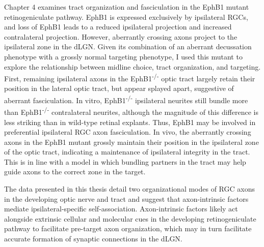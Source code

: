 Chapter 4 examines tract organization and fasciculation in the EphB1 mutant retinogeniculate pathway.
EphB1 is expressed exclusively by ipsilateral RGCs, and loss of EphB1 leads to a reduced ipsilateral projection and increased contralateral projection.
However, aberrantly crossing axons project to the ipsilateral zone in the dLGN.
Given its combination of an aberrant decussation phenotype with a grossly normal targeting phenotype, I used this mutant to explore the relationship between midline choice, tract organization, and targeting.
First, remaining ipsilateral axons in the EphB1\textsuperscript{-/-} optic tract largely retain their position in the lateral optic tract, but appear splayed apart, suggestive of aberrant fasciculation.
In vitro, EphB1\textsuperscript{-/-} ipsilateral neurites still bundle more than EphB1\textsuperscript{-/-} contralateral neurites, although the magnitude of this difference is less striking than in wild-type retinal explants.
Thus, EphB1 may be involved in preferential ipsilateral RGC axon fasciculation.
In vivo, the aberrantly crossing axons in the EphB1 mutant grossly maintain their position in the ipsilateral zone of the optic tract, indicating a maintenance of ipsilateral integrity in the tract.
This is in line with a model in which bundling partners in the tract may help guide axons to the correct zone in the target.

The data presented in this thesis detail two organizational modes of RGC axons in the developing optic nerve and tract and suggest that axon-intrinsic factors mediate ipsilateral-specific self-association.
Axon-intrinsic factors likely act alongside extrinsic cellular and molecular cues in the developing retinogeniculate pathway to facilitate pre-target axon organization, which may in turn facilitate accurate formation of synaptic connections in the dLGN.